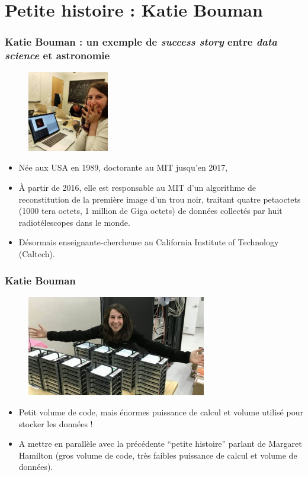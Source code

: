 \documentclass{beamer}
\begin{document}
\section{Petite histoire : Katie Bouman}

\frame
{
\frametitle{Katie Bouman : un exemple de \textit{success story} entre \textit{data science} et astronomie}
{\footnotesize
\begin{figure}
  \includegraphics[height=100pt]{katie_bouman.jpg}
\end{figure}
\begin{itemize}
  \item Née aux USA en 1989, doctorante au MIT jusqu'en 2017,
  \item À partir de 2016, elle est responsable au MIT d'un algorithme de reconstitution de la première image d'un trou noir, traitant quatre petaoctets (1000 tera octets, 1 million de Giga octets) de données collectés par huit radiotélescopes dans le monde.
  \item Désormais enseignante-chercheuse au California Institute of Technology (Caltech).
\end{itemize}
}
}

\frame
{
\frametitle{Katie Bouman}
{\footnotesize
\begin{figure}
  \includegraphics[height=125pt]{katie_bouman_harddrive.jpg}
\end{figure}
\begin{itemize}
  \item Petit volume de code, mais énormes puissance de calcul et volume utilisé pour stocker les données !
  \item A mettre en parallèle avec la précédente ``petite histoire'' parlant de Margaret Hamilton (gros volume de code, très faibles puissance de calcul et volume de données).
\end{itemize}
}
}
\end{document}
